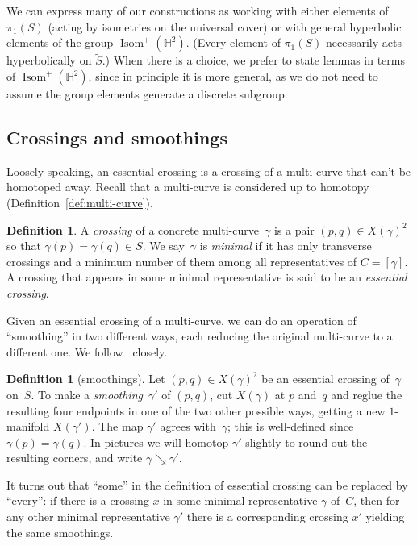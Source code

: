 \documentclass[11pt]{amsart}
\numberwithin{equation}{section}
\numberwithin{figure}{section}
\theoremstyle{definition}
\newtheorem{definition}[theorem]{Definition}
\theoremstyle{plain}
\newcommand\bbH{\ensuremath{\mathbb{H}}}
\DeclareMathOperator{\Isom}{Isom}
\newcommand*{\wt}[1]{\widetilde{#1}}
\newcommand{\reducesto}{\mathrel{\searrow}}
\begin{document}
We can express many of our constructions as working with either
elements of $\pi_1(S)$ (acting by isometries on the universal cover)
or with general hyperbolic elements of the group $\Isom^+(\bbH^2)$.
(Every element of $\pi_1(S)$ necessarily acts hyperbolically on
$\wt S$.) When there is a choice, we prefer to state lemmas in terms
of $\Isom^+(\bbH^2)$, since in principle it is more general, as we do
not need to assume the group elements generate a discrete subgroup.


\subsection{Crossings and smoothings}
\label{subsec:crossings}

Loosely speaking, an essential crossing is a crossing of a
multi-curve that can't be homotoped away. Recall that a multi-curve is
considered up to homotopy (Definition~\ref{def:multi-curve}).

\begin{definition}\label{def:essential-crossing}
  A \emph{crossing} of a concrete multi-curve~$\gamma$ is a pair
  $(p,q) \in X(\gamma)^2$ so that
  $\gamma(p) = \gamma(q) \in S$. We say~$\gamma$ is \emph{minimal} if
  it has only transverse crossings and a minimum number of
  them among all representatives of $C = [\gamma]$.
  A crossing that appears in some minimal representative is said
  to be an \emph{essential crossing}.
\end{definition}

Given an essential crossing of a multi-curve, we can do an operation
of ``smoothing'' in two different ways, each reducing the original
multi-curve to a different one.
We follow~\cite{MGT25:SmoothingsErratum} closely.


\begin{definition}[smoothings]
  \label{def:smoothing}
  Let $(p,q) \in X(\gamma)^2$ be an essential crossing of~$\gamma$
  on~$S$. To make a \emph{smoothing}~$\gamma'$ of $(p,q)$, cut
  $X(\gamma)$ at $p$ and~$q$ and reglue the resulting four endpoints
  in one of the two other possible ways, getting a new $1$-manifold
  $X(\gamma')$. The map $\gamma'$ agrees with~$\gamma$; this is
  well-defined since $\gamma(p) = \gamma(q)$. In pictures we will
  homotop $\gamma'$ slightly to round out the resulting
  corners, and write $\gamma \reducesto \gamma'$.
\end{definition}

It turns out that ``some'' in the definition of essential crossing can be replaced by ``every'': if there is a crossing $x$ in some minimal representative $\gamma$ of~$C$, then for any other minimal representative $\gamma'$ there is a corresponding crossing $x'$ yielding the same smoothings.
\end{document}
